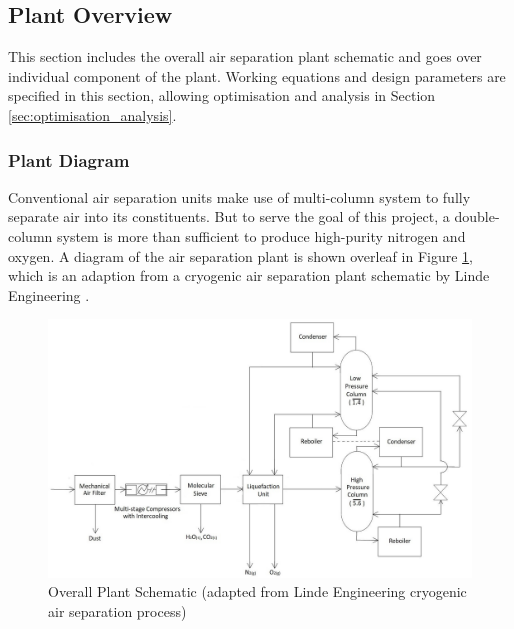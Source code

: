 \subsection{Plant Overview} \noindent
This section includes the overall air separation plant schematic and goes over individual component of the plant. Working equations and design parameters are specified in this section, allowing optimisation and analysis in Section \ref{sec:optimisation_analysis}.
	\subsubsection{Plant Diagram} \noindent
    Conventional air separation units make use of multi-column system to fully separate air into its constituents. But to serve the goal of this project, a double-column system is more than sufficient to produce high-purity nitrogen and oxygen. A diagram of the air separation plant is shown overleaf in Figure \ref{plant_diagram}, which is an adaption from a cryogenic air separation plant schematic by Linde Engineering \cite{linde_cryo}. 
    \begin{figure}
        \centering
	    \includegraphics[width=\linewidth]{airseparation/graphics/plant_diagram.jpg}
        \caption{Overall Plant Schematic (adapted from Linde Engineering cryogenic air separation process)}
	    \label{plant_diagram}
    \end{figure}
